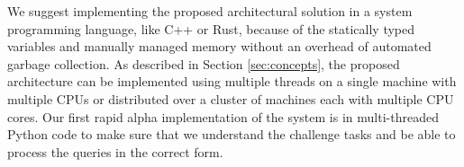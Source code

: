 We suggest implementing the proposed architectural solution in a system programming language, like C++ or Rust, because of the statically typed variables and manually managed memory without an overhead of automated garbage collection. As described in Section \ref{sec:concepts}, the proposed architecture can be implemented using multiple threads on a single machine with multiple CPUs or distributed over a cluster of machines each with multiple CPU cores.
Our first rapid alpha implementation of the system is in multi-threaded Python code to make sure that we understand the challenge tasks and be able to process the queries in the correct form.
